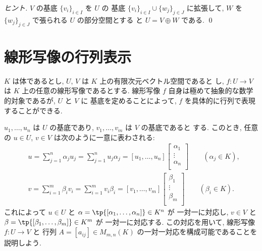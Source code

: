 \documentclass[12pt,twoside]{jarticle}
\begin{document}
\begin{proof}[ヒント]
  $V$ の基底 $\{v_i\}_{i\in I}$ を $U$ の
  基底 $\{v_i\}_{i\in I}\cup\{w_j\}_{j\in J}$ に拡張して,
  $W$ を $\{w_j\}_{j\in J}$ で張られる $U$ の部分空間とする
  と $U=V\oplus W$ である.
  \qed
\end{proof}


\section{線形写像の行列表示}
\label{sec:matrix-rep}

$K$ は体であるとし, $U$, $V$ は $K$ 上の有限次元ベクトル空間であると
し, $f:U\to V$ は $K$ 上の任意の線形写像であるとする. 
線形写像 $f$ 自身は極めて抽象的な数学的対象であるが, $U$ と $V$ に
基底を定めることによって, $f$ を具体的に行列で表現することができる. 

$u_1,\ldots,u_n$ は $U$ の基底であり, $v_1,\ldots,v_m$ は $V$ の基底であると
する. このとき, 任意の $u\in U$, $v\in V$ は次のように一意に表わされる:
\begin{align*}
  &
  u 
  = \sum_{j=1}^n \alpha_j u_j 
  = \sum_{j=1}^n u_j \alpha_j
  =
  [u_1,\ldots,u_n]
  \begin{bmatrix}
    \alpha_1 \\
    \vdots \\
    \alpha_n \\
  \end{bmatrix}
  \qquad (\alpha_j\in K),
  \\ &
  v
  = \sum_{i=1}^m \beta_i v_i 
  = \sum_{i=1}^m v_i \beta_i 
  =
  [v_1,\ldots,v_m]
  \begin{bmatrix}
    \beta_1 \\
    \vdots \\
    \beta_m \\
  \end{bmatrix}
  \qquad (\beta_i\in K).
\end{align*}
これによって $u\in U$ と $\alpha=\tp{[\alpha_1,\ldots,\alpha_n]}\in K^n$ が
一対一に対応し, $v\in V$ と $\beta=\tp{[\beta_1,\ldots,\beta_m]}\in K^m$ が
一対一に対応する.
この対応を用いて, 線形写像 $f:U\to V$ と
行列 $A=[a_{ij}]\in M_{m,n}(K)$ の一対一対応を構成可能であることを
説明しよう.
\end{document}
